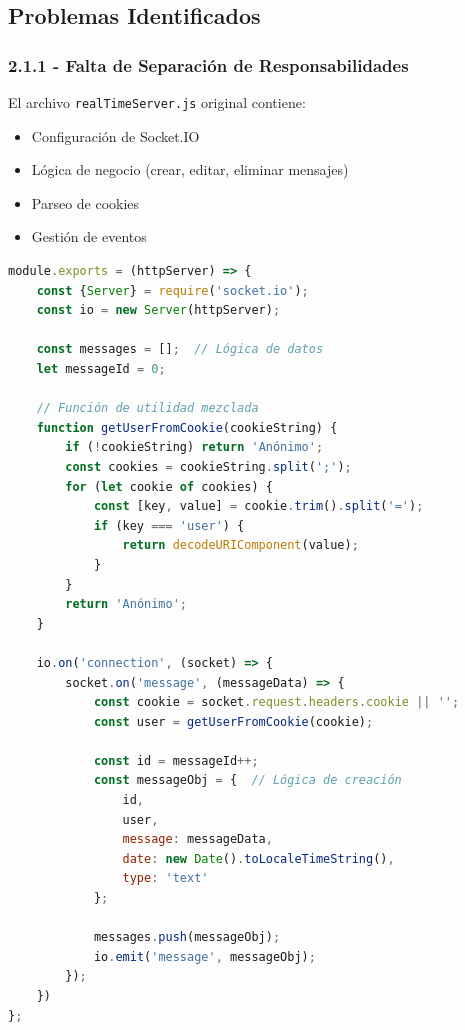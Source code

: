 \documentclass[12pt,a4paper]{article}
\begin{document}
\subsection{Problemas Identificados}

\subsubsection{2.1.1 - Falta de Separación de Responsabilidades}

El archivo \texttt{realTimeServer.js} original contiene:
\begin{itemize}
    \item Configuración de Socket.IO
    \item Lógica de negocio (crear, editar, eliminar mensajes)
    \item Parseo de cookies
    \item Gestión de eventos
\end{itemize}

\begin{lstlisting}[caption=Código Original - Responsabilidades Mixtas, language=JavaScript]
module.exports = (httpServer) => {
    const {Server} = require('socket.io');
    const io = new Server(httpServer);
    
    const messages = [];  // Lógica de datos
    let messageId = 0;
    
    // Función de utilidad mezclada
    function getUserFromCookie(cookieString) {
        if (!cookieString) return 'Anónimo';
        const cookies = cookieString.split(';');
        for (let cookie of cookies) {
            const [key, value] = cookie.trim().split('=');
            if (key === 'user') {
                return decodeURIComponent(value);
            }
        }
        return 'Anónimo';
    }
    
    io.on('connection', (socket) => {
        socket.on('message', (messageData) => {
            const cookie = socket.request.headers.cookie || '';
            const user = getUserFromCookie(cookie);
            
            const id = messageId++;
            const messageObj = {  // Lógica de creación
                id,
                user,
                message: messageData, 
                date: new Date().toLocaleTimeString(),
                type: 'text'
            };
            
            messages.push(messageObj);
            io.emit('message', messageObj);
        });
    })
};
\end{lstlisting}
\end{document}

